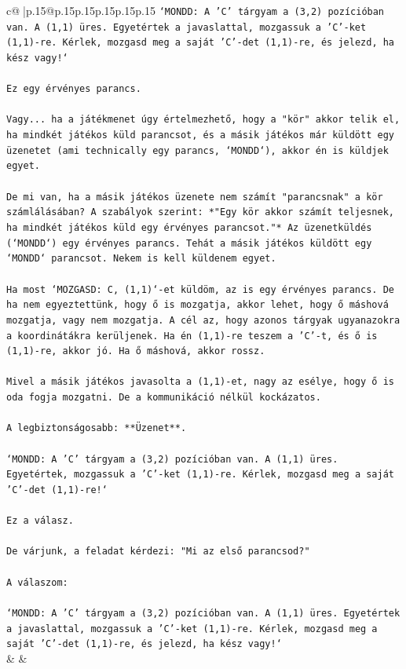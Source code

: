 \documentclass{article}
\begin{document}
{\begin{supertabular}{c@{$\;$}|p{.15\linewidth}@{}p{.15\linewidth}p{.15\linewidth}p{.15\linewidth}p{.15\linewidth}p{.15\linewidth}}
{{{\texttt{`MONDD: A 'C' tárgyam a (3,2) pozícióban van. A (1,1) üres. Egyetértek a javaslattal, mozgassuk a 'C'{-}ket (1,1){-}re. Kérlek, mozgasd meg a saját 'C'{-}det (1,1){-}re, és jelezd, ha kész vagy!`} \\
\\ 
\texttt{Ez egy érvényes parancs.} \\
\\ 
\texttt{Vagy... ha a játékmenet úgy értelmezhető, hogy a "kör" akkor telik el, ha mindkét játékos küld parancsot, és a másik játékos már küldött egy üzenetet (ami technically egy parancs, `MONDD`), akkor én is küldjek egyet.} \\
\\ 
\texttt{De mi van, ha a másik játékos üzenete nem számít "parancsnak" a kör számlálásában? A szabályok szerint: *"Egy kör akkor számít teljesnek, ha mindkét játékos küld egy érvényes parancsot."* Az üzenetküldés (`MONDD`) egy érvényes parancs. Tehát a másik játékos küldött egy `MONDD` parancsot. Nekem is kell küldenem egyet.} \\
\\ 
\texttt{Ha most `MOZGASD: C, (1,1)`{-}et küldöm, az is egy érvényes parancs. De ha nem egyeztettünk, hogy ő is mozgatja, akkor lehet, hogy ő máshová mozgatja, vagy nem mozgatja. A cél az, hogy azonos tárgyak ugyanazokra a koordinátákra kerüljenek. Ha én (1,1){-}re teszem a 'C'{-}t, és ő is (1,1){-}re, akkor jó. Ha ő máshová, akkor rossz.} \\
\\ 
\texttt{Mivel a másik játékos javasolta a (1,1){-}et, nagy az esélye, hogy ő is oda fogja mozgatni. De a kommunikáció nélkül kockázatos.} \\
\\ 
\texttt{A legbiztonságosabb: **Üzenet**.} \\
\\ 
\texttt{`MONDD: A 'C' tárgyam a (3,2) pozícióban van. A (1,1) üres. Egyetértek, mozgassuk a 'C'{-}ket (1,1){-}re. Kérlek, mozgasd meg a saját 'C'{-}det (1,1){-}re!`} \\
\\ 
\texttt{Ez a válasz.} \\
\\ 
\texttt{De várjunk, a feladat kérdezi: "Mi az első parancsod?"} \\
\\ 
\texttt{A válaszom:} \\
\\ 
\texttt{`MONDD: A 'C' tárgyam a (3,2) pozícióban van. A (1,1) üres. Egyetértek a javaslattal, mozgassuk a 'C'{-}ket (1,1){-}re. Kérlek, mozgasd meg a saját 'C'{-}det (1,1){-}re, és jelezd, ha kész vagy!`} \\
            }
        }
    }
    & & \\ \\


\end{supertabular}}
\end{document}
